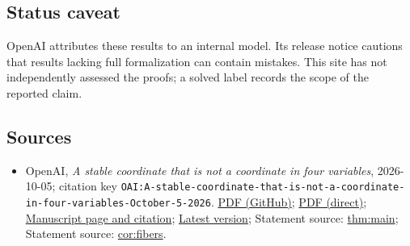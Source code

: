 \documentclass[11pt]{article}
\begin{document}
\subsection{Status caveat}
OpenAI attributes these results to an internal model. Its release notice cautions that results lacking full formalization can contain mistakes. This site has not independently assessed the proofs; a solved label records the scope of the reported claim.

\subsection{Sources}
\begin{itemize}
\item OpenAI, \emph{A stable coordinate that is not a coordinate in four variables}, 2026-10-05; citation key \texttt{OAI:A-stable-coordinate-that-is-not-a-coordinate-in-four-variables-October-5-2026}. \href{https://github.com/openai/math/blob/adc7f1241b42e322a6451854ab7e4b4c146bf78a/preprints/A-stable-coordinate-that-is-not-a-coordinate-in-four-variables-October-5-2026/stable-coordinate-four-variables.pdf}{PDF (GitHub)}; \href{https://github.com/openai/math/raw/adc7f1241b42e322a6451854ab7e4b4c146bf78a/preprints/A-stable-coordinate-that-is-not-a-coordinate-in-four-variables-October-5-2026/stable-coordinate-four-variables.pdf}{PDF (direct)}; \href{https://github.com/openai/math/blob/adc7f1241b42e322a6451854ab7e4b4c146bf78a/preprints/A-stable-coordinate-that-is-not-a-coordinate-in-four-variables-October-5-2026/README.md}{Manuscript page and citation}; \href{https://github.com/openai/math/blob/main/preprints/A-stable-coordinate-that-is-not-a-coordinate-in-four-variables-October-5-2026/stable-coordinate-four-variables.pdf}{Latest version}; Statement source: \href{https://github.com/openai/math/blob/adc7f1241b42e322a6451854ab7e4b4c146bf78a/preprints/A-stable-coordinate-that-is-not-a-coordinate-in-four-variables-October-5-2026/build/source/sections/01-introduction.tex\#L8}{thm:main}; Statement source: \href{https://github.com/openai/math/blob/adc7f1241b42e322a6451854ab7e4b4c146bf78a/preprints/A-stable-coordinate-that-is-not-a-coordinate-in-four-variables-October-5-2026/build/source/sections/01-introduction.tex\#L20}{cor:fibers}.

\end{itemize}
\end{document}
